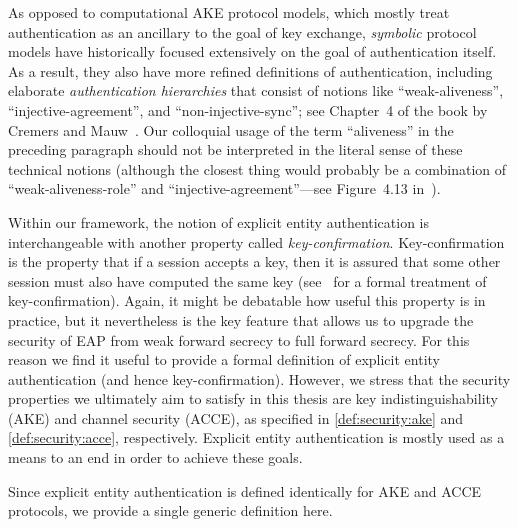 \begin{remark}
As opposed to computational AKE protocol models,
which mostly treat authentication as an ancillary to the goal of key exchange,
\emph{symbolic} protocol models have historically focused extensively on the goal of authentication itself.
As a result,
they also have more refined definitions of authentication,
including elaborate \emph{authentication hierarchies}
that consist of notions like ``weak-aliveness'', ``injective-agreement'', and ``non-injective-sync'';
see Chapter~4 of the book by Cremers and Mauw~\cite{CremersM:2012:book:operational_semantics}.
Our colloquial usage of the term ``aliveness'' in the preceding paragraph should not be interpreted in the literal sense of these technical notions
(although the closest thing would probably be a combination of ``weak-aliveness-role'' and ``injective-agreement''---see Figure~4.13 in~\cite{CremersM:2012:book:operational_semantics}). 
\end{remark}

Within our framework,
the notion of explicit entity authentication is interchangeable with another property called \emph{key-confirmation}.
Key-confirmation is the property that if a session accepts a key,
then it is  assured that some other session must also have computed the same key
(see~\cite{SP:FGSW16} for a formal treatment of key-confirmation).
Again,
it might be debatable how useful this property is in practice,
but it nevertheless is the key feature that allows us to upgrade the security of EAP from weak forward secrecy to full forward secrecy.
For this reason we find it useful to provide a formal definition of explicit entity authentication
(and hence key-confirmation).
However,
we stress that the security properties we ultimately aim to satisfy in this thesis are key indistinguishability (AKE) 
and channel security (ACCE),
as specified in \cref{def:security:ake} and \cref{def:security:acce}, respectively.
Explicit entity authentication is mostly used as a means to an end in order to achieve these goals.

Since explicit entity authentication is defined identically for AKE and ACCE protocols,
we provide a single generic definition here.


